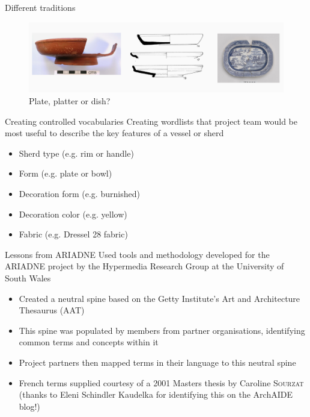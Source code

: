 \documentclass[xcolor=x11names, aspectratio=169,usenames,dvipsnames]{beamer}
\begin{document}
\begin{frame}{Different traditions}
\begin{center}
\begin{figure}
\includegraphics[width=\textwidth]{img/tim_plate_platter_dish.jpg}
\caption{Plate, platter or dish?}
\end{figure}
\end{center}
\end{frame}

\begin{frame}{Creating controlled vocabularies}
Creating wordlists that project team would be most useful to describe the key features of a vessel or sherd
\begin{itemize}
\item Sherd type (e.g. rim or handle)
\item Form (e.g. plate or bowl)
\item Decoration form (e.g. burnished)
\item Decoration color (e.g. yellow)
\item Fabric (e.g. Dressel 28 fabric)
\end{itemize}
\end{frame}

\begin{frame}{Lessons from ARIADNE}
\hfill{}\newline
Used tools and methodology developed for the ARIADNE project by the Hypermedia Research Group at the University of South Wales 
\begin{itemize}
\item Created a neutral spine based on the Getty Institute's Art and Architecture Thesaurus (AAT)
\item This spine was populated by members from partner organisations, identifying common terms and concepts within it
\item Project partners then mapped terms in their language to this neutral spine
\item French terms supplied courtesy of a 2001 Masters thesis by Caroline \textsc{Sourzat} (thanks to Eleni Schindler Kaudelka for identifying this on the ArchAIDE blog!)
\end{itemize}
\end{frame}
\end{document}

